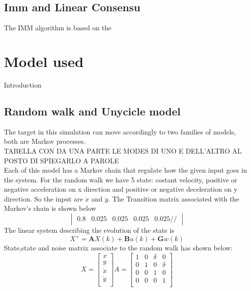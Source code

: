 \documentclass{article}
\begin{document}
\begin{multicols}{2}
    \subsection*{Imm and Linear Consensu}
    The IMM algorithm is based on the

    \section*{Model used}
    Introduction

    \subsection*{Random walk and Unycicle model}
    The target in this simulation can move accordingly to two families of models, both are Markov processes.
    \\
    TABELLA CON DA UNA PARTE LE MODES DI UNO E DELL'ALTRO AL POSTO DI SPIEGARLO A PAROLE
    \\
    Each of this model has a Markov chain that
    regulate how the given input goes in the system. For the random walk we have 5 state: costant velocity, positive or negative acceleration
    on x direction and positive or negative deceleration on y direction. So the input are $\ddot{x}$ and $\ddot{y}$. The Transition matrix 
    associated with the Markov's chain is shown below
    $$\begin{vmatrix}
            0.8 & 0.025 & 0.025 & 0.025 & 0.025 //
        \end{vmatrix}$$
    The linear system describing the evolution of the state is 
    \begin{equation}
        X^{+}= \textbf{A}X(k) + \textbf{B}u(k) + \textbf{G}w(k)
    \end{equation}
    State,state and noise matrix associate to the random walk has shown below:
    \[ X=\begin{bmatrix} x \\ y \\ \dot{x} \\ \dot{y} \\ \end{bmatrix}  A=\begin{bmatrix}
            1 & 0 & \delta & 0      \\
            0 & 1 & 0      & \delta \\
            0 & 0 & 1      & 0      \\
            0 & 0 & 0      & 1      \\
        \end{bmatrix}
\]
\end{multicols}
\end{document}
